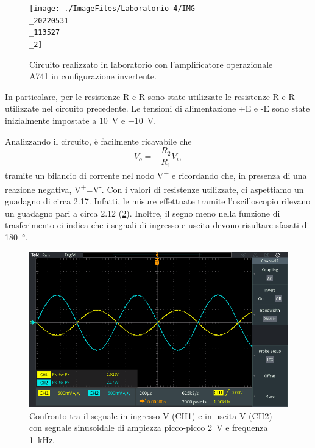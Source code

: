 \begin{figure}[h!]
	\centering
	\texttt{[image: ./ImageFiles/Laboratorio 4/IMG\\\_20220531\\\_113527\\\_2]}
	\caption{Circuito realizzato in laboratorio con l'amplificatore operazionale \textmu A741 in configurazione invertente.}
	\label{fig:opamp_inv_circuito}
\end{figure}

\noindent
In particolare, per le resistenze R e R sono state utilizzate le resistenze R e R utilizzate nel circuito precedente. Le tensioni di alimentazione +E e -E sono state inizialmente impostate a \SI{+10}{\volt} e \SI{-10}{\volt}.

\noindent
Analizzando il circuito, è facilmente ricavabile che 
\begin{equation}
	V_o=-\frac{R_2}{R_1}V_i,
\end{equation}
tramite un bilancio di corrente nel nodo V\textsuperscript{+} e ricordando che, in presenza di una reazione negativa, V\textsuperscript{+}=V\textsuperscript{-}. Con i valori di resistenze utilizzate, ci aspettiamo un guadagno di circa 2.17. Infatti, le misure effettuate tramite l'oscilloscopio rilevano un guadagno pari a circa 2.12 (\Fig\ref{fig:opamp_inv_amp}). Inoltre, il segno meno nella funzione di trasferimento ci indica che i segnali di ingresso e uscita devono risultare sfasati di \SI{180}{\degree}.
\begin{figure}[h!]
	\centering
	\includegraphics[width=0.7\linewidth]{./ImageFiles/Laboratorio 4/TEK00005}
	\caption{Confronto tra il segnale in ingresso V (CH1)  e in uscita V (CH2) con segnale sinusoidale di ampiezza picco-picco \SI{2}{\volt} e frequenza \SI{1}{\kilo\hertz}.}
	\label{fig:opamp_inv_amp}
\end{figure}

